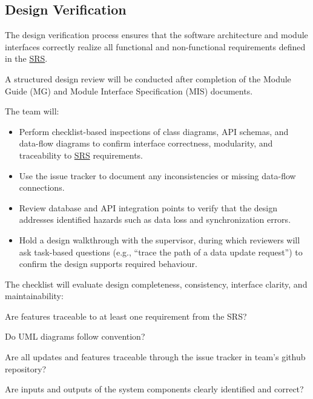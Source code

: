 \documentclass[12pt, titlepage]{article}
\begin{document}
\subsection{Design Verification}
\label{subsec:design-verification}
The design verification process ensures that the software architecture and
module interfaces correctly realize all functional and non-functional
requirements defined in the \href{https://github.com/thaafei/DomainX/blob/main/docs/SRS/SRS.pdf}{SRS}.

A structured design review will be conducted after completion of the Module
Guide (MG) and Module Interface Specification (MIS) documents.

The team will:

\begin{itemize}
  \item Perform checklist-based inspections of class diagrams, API schemas, and
  data-flow diagrams to confirm interface correctness, modularity, and
  traceability to \href{https://github.com/thaafei/DomainX/blob/main/docs/SRS/SRS.pdf}{SRS} requirements.

  \item Use the issue tracker to document any inconsistencies or missing
  data-flow connections.

  \item Review database and API integration points to verify that the design
  addresses identified hazards such as data loss and synchronization errors.

  \item Hold a design walkthrough with the supervisor, during which reviewers
  will ask task-based questions (e.g., ``trace the path of a data update
  request'') to confirm the design supports required behaviour.
\end{itemize}

The checklist will evaluate design completeness, consistency, interface
clarity, and maintainability:
\begin{todolist}
  \item Are features traceable to at least one requirement from the SRS?
  \item Do UML diagrams follow convention?
  \item Are all updates and features traceable through the issue tracker in team's github repository?
  \item Are inputs and outputs of the system components clearly identified and correct?
\end{todolist}
\end{document}
